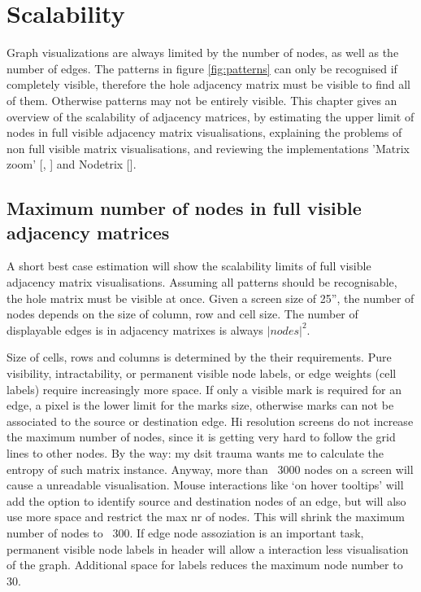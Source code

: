 \chapter{Scalability}
\label{chap:Scalability}

Graph visualizations are always limited by the number of nodes, as well as the number of edges. The patterns in figure \ref{fig:patterns} can only be recognised if completely visible, therefore the hole adjacency matrix must be visible to find all of them. Otherwise patterns may not be entirely visible. This chapter gives an overview of the scalability of adjacency matrices, by estimating the upper limit of nodes in full visible adjacency matrix visualisations, explaining the problems of non full visible matrix visualisations, and reviewing the implementations 'Matrix zoom' [\cite{ham-ivis-2003}, \cite{abello2004}] and Nodetrix [\cite{henry-nodetrix-2007}].


\section{Maximum number of nodes in full visible adjacency matrices}
A short best case estimation will show the scalability limits of full visible adjacency matrix visualisations. Assuming all patterns should be recognisable, the hole matrix must be visible at once. Given a screen size of 25”, the number of nodes depends on the size of column, row and cell size. The number of displayable edges is in adjacency matrixes is always $|nodes|^2$.

Size of cells, rows and columns is determined by the their requirements. Pure visibility, intractability, or permanent visible node labels, or edge weights (cell labels) require increasingly more space.
If only a visible mark is required for an edge, a pixel is the lower limit for the marks size, otherwise marks can not be associated to the source or destination edge. Hi resolution screens do not increase the maximum number of nodes, since it is getting very hard to follow the grid lines to other nodes. By the way: my dsit trauma wants me to calculate the entropy of such matrix instance. Anyway, more than ~3000 nodes on a screen will cause a unreadable visualisation.
Mouse interactions like ‘on hover tooltips’ will add the option to identify source and destination nodes of an edge, but will also use more space and restrict the max nr of nodes. This will shrink the maximum number of nodes to ~300.
If edge node assoziation is an important task, permanent visible node labels in header will allow a interaction less visualisation of the graph. Additional space for labels reduces the maximum node number to 30.
 
